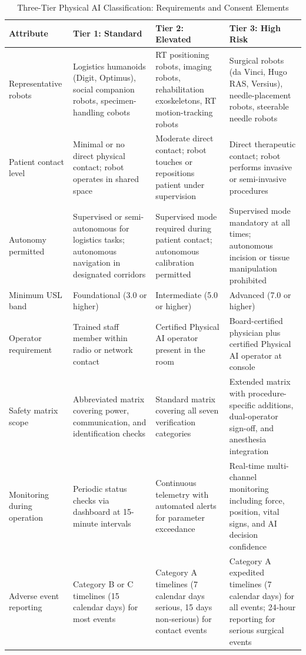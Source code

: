 \begin{table}[H]
\centering
\caption{Three-Tier Physical AI Classification: Requirements and Consent Elements}
\label{tab:three-tier-detail}
\scriptsize
\begin{tabularx}{\textwidth}{p{2cm} X X X}
\toprule
\textbf{Attribute} & \textbf{Tier 1: Standard} & \textbf{Tier 2: Elevated} & \textbf{Tier 3: High Risk} \\
\midrule
Representative robots & Logistics humanoids (Digit, Optimus), social companion robots, specimen-handling cobots & RT positioning robots, imaging robots, rehabilitation exoskeletons, RT motion-tracking robots & Surgical robots (da Vinci, Hugo RAS, Versius), needle-placement robots, steerable needle robots \\
\midrule
Patient contact level & Minimal or no direct physical contact; robot operates in shared space & Moderate direct contact; robot touches or repositions patient under supervision & Direct therapeutic contact; robot performs invasive or semi-invasive procedures \\
\midrule
Autonomy permitted & Supervised or semi-autonomous for logistics tasks; autonomous navigation in designated corridors & Supervised mode required during patient contact; autonomous calibration permitted & Supervised mode mandatory at all times; autonomous incision or tissue manipulation prohibited \\
\midrule
Minimum USL band & Foundational (3.0 or higher) & Intermediate (5.0 or higher) & Advanced (7.0 or higher) \\
\midrule
Operator requirement & Trained staff member within radio or network contact & Certified Physical AI operator present in the room & Board-certified physician plus certified Physical AI operator at console \\
\midrule
Safety matrix scope & Abbreviated matrix covering power, communication, and identification checks & Standard matrix covering all seven verification categories & Extended matrix with procedure-specific additions, dual-operator sign-off, and anesthesia integration \\
\midrule
Monitoring during operation & Periodic status checks via dashboard at 15-minute intervals & Continuous telemetry with automated alerts for parameter exceedance & Real-time multi-channel monitoring including force, position, vital signs, and AI decision confidence \\
\midrule
Adverse event reporting & Category B or C timelines (15 calendar days) for most events & Category A timelines (7 calendar days serious, 15 days non-serious) for contact events & Category A expedited timelines (7 calendar days) for all events; 24-hour reporting for serious surgical events \\

\end{tabularx}
\end{table}
